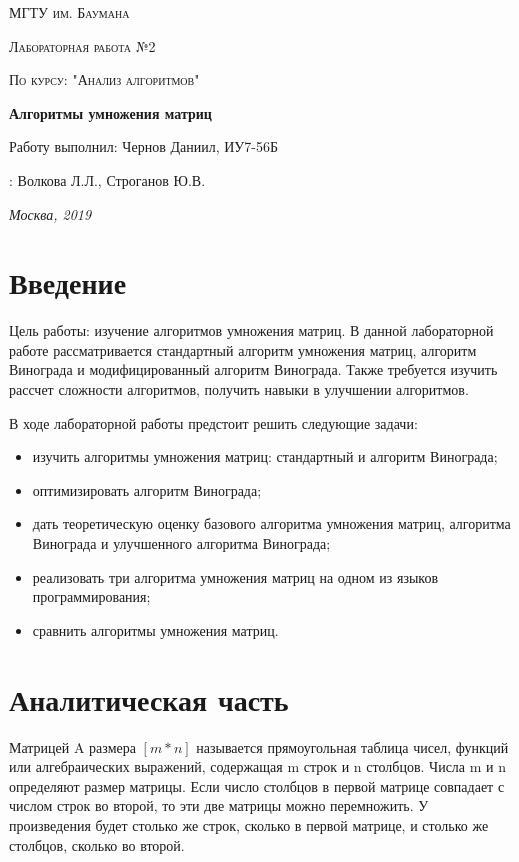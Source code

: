 \documentclass[12pt]{report}
\begin{document}
\begin{titlepage}
	\centering
	{\scshape\LARGE МГТУ им. Баумана \par}
	\vspace{3cm}
	{\scshape\Large Лабораторная работа №2\par}
	\vspace{0.5cm}	
	{\scshape\Large По курсу: "Анализ алгоритмов"\par}
	\vspace{1.5cm}
	{\huge\bfseries Алгоритмы умножения матриц\par}
	\vspace{2cm}
	\Large Работу выполнил: Чернов Даниил, ИУ7-56Б\par
	\vspace{0.5cm}
	:  Волкова Л.Л., Строганов Ю.В.\par

	\vfill
	\large \textit {Москва, 2019} \par
\end{titlepage}

\tableofcontents

\newpage
\chapter*{Введение}
Цель работы: изучение алгоритмов умножения матриц. В данной лабораторной работе рассматривается стандартный алгоритм умножения матриц, алгоритм Винограда и модифицированный алгоритм Винограда.  Также требуется изучить рассчет сложности алгоритмов, получить навыки в улучшении алгоритмов.


В ходе лабораторной работы предстоит решить следующие задачи:
\begin{itemize}
	\item изучить алгоритмы умножения матриц: стандартный и алгоритм Винограда; 
	\item оптимизировать алгоритм Винограда; 
	\item дать теоретическую оценку базового алгоритма умножения матриц, алгоритма Винограда и улучшенного алгоритма Винограда;
	\item реализовать три алгоритма умножения матриц на одном из языков программирования;  
	\item сравнить алгоритмы умножения матриц.
\end{itemize}



\chapter{Аналитическая часть}
Матрицей A размера $[m*n]$ называется прямоугольная таблица
чисел, функций или алгебраических выражений, содержащая m строк и n столбцов. Числа m и n определяют размер матрицы.\cite{Beloysov} Если число столбцов в первой матрице совпадает с числом строк во второй, то эти две матрицы можно перемножить. У произведения будет столько же строк, сколько в первой матрице, и столько же столбцов, сколько во второй.
	    
\end{document}
